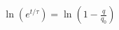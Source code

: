 \documentclass[preview]{standalone}
\begin{document}
\begin{align*}
\ln(e^{t/\tau}) = \ln\left(1 - \frac{q}{q_{0}}\right)
\end{align*}
\end{document}
